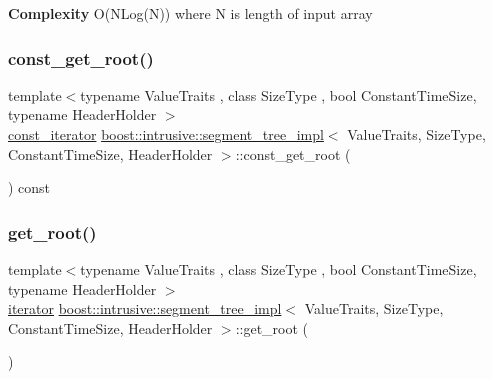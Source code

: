 {\bfseries  Complexity } O(\+N\+Log(\+N)) where N is length of input array \mbox{\label{classboost_1_1intrusive_1_1segment__tree__impl_a562cca39fe52f31330ff71f32d58fb72}} 
\subsubsection{\texorpdfstring{const\+\_\+get\+\_\+root()}{const\_get\_root()}}
{\footnotesize\ttfamily template$<$typename Value\+Traits , class Size\+Type , bool Constant\+Time\+Size, typename Header\+Holder $>$ \\
\hyperlink{classboost_1_1intrusive_1_1segment__tree__impl_a6957e501101f1d5427f611f6ee8d1ded}{const\+\_\+iterator} \hyperlink{classboost_1_1intrusive_1_1segment__tree__impl}{boost\+::intrusive\+::segment\+\_\+tree\+\_\+impl}$<$ Value\+Traits, Size\+Type, Constant\+Time\+Size, Header\+Holder $>$\+::const\+\_\+get\+\_\+root (\begin{DoxyParamCaption}{ }\end{DoxyParamCaption}) const\hspace{0.3cm}{\ttfamily [inline]}}

\mbox{\label{classboost_1_1intrusive_1_1segment__tree__impl_a684131001e17323dfbf6b1781c632471}} 
\subsubsection{\texorpdfstring{get\+\_\+root()}{get\_root()}}
{\footnotesize\ttfamily template$<$typename Value\+Traits , class Size\+Type , bool Constant\+Time\+Size, typename Header\+Holder $>$ \\
\hyperlink{classboost_1_1intrusive_1_1segment__tree__impl_a9f1be9b01be5078fb59b2e34520b374a}{iterator} \hyperlink{classboost_1_1intrusive_1_1segment__tree__impl}{boost\+::intrusive\+::segment\+\_\+tree\+\_\+impl}$<$ Value\+Traits, Size\+Type, Constant\+Time\+Size, Header\+Holder $>$\+::get\+\_\+root (\begin{DoxyParamCaption}{ }\end{DoxyParamCaption})\hspace{0.3cm}{\ttfamily [inline]}}

